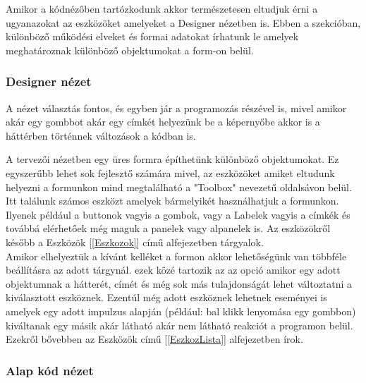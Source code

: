 \documentclass[tocnopagenum]{thesis-ekf}
\theoremstyle{definition}
\theoremstyle{remark}
\begin{document}
	Amikor a kódnézőben tartózkodunk akkor természetesen eltudjuk érni a ugyanazokat az eszközöket amelyeket a Designer nézetben is.
	Ebben a szekcióban, különböző működési elveket és formai adatokat írhatunk le amelyek meghatároznak különböző objektumokat a form-on belül. 
	\subsubsection*{Designer nézet}
	A nézet választás fontos, és egyben jár a programozás részével is, mivel amikor akár egy gombbot akár egy címkét helyezünk be a képernyőbe akkor is a háttérben történnek változások a kódban is.
	
	A tervezői nézetben egy üres formra építhetünk különböző objektumokat.
	Ez egyszerűbb lehet sok fejlesztő számára mivel, az eszközöket amiket eltudunk helyezni a formunkon mind megtalálható a "Toolbox" nevezetű oldalsávon belül.
	\\
	Itt találunk számos eszközt amelyek bármelyikét használhatjuk a formunkon. Ilyenek például a buttonok vagyis a gombok, vagy a Labelek vagyis a címkék és továbbá elérhetőek még maguk a panelek vagy alpanelek is. Az eszközökről később a  Eszközök [\ref{Eszkozok}] című alfejezetben tárgyalok.
	\\
	Amikor elhelyeztük a kívánt kelléket a formon akkor lehetőségünk van többféle beállításra az adott tárgynál. ezek közé tartozik az az opció amikor egy adott objektumnak a hátterét, címét és még sok más tulajdonságát lehet változtatni a kiválasztott eszköznek. Ezentúl még adott eszköznek lehetnek eseményei is amelyek egy adott impulzus alapján (például: bal klikk lenyomása egy gombbon) kiváltanak egy másik akár látható akár nem látható reakciót a programon belül. Ezekről bővebben az Eszközök című [\ref{EszkozLista}] alfejezetben írok.
	
	\subsubsection*{Alap kód nézet}
	
\end{document}
